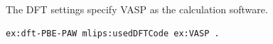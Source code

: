 The DFT settings specify VASP as the calculation software.
\begin{lstlisting}[language=turtle]
ex:dft-PBE-PAW mlips:usedDFTCode ex:VASP .
\end{lstlisting}

